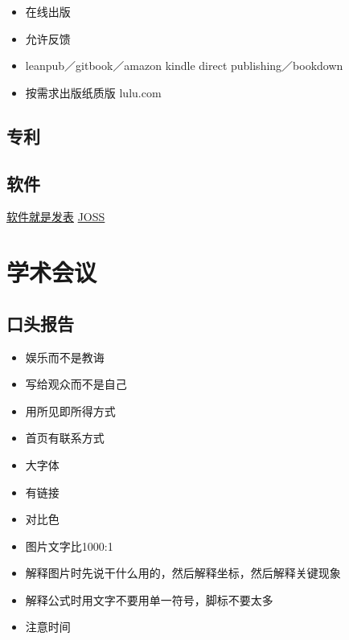\documentclass[]{tufte-book}
\providecommand{\tightlist}{%
  \setlength{\itemsep}{0pt}\setlength{\parskip}{0pt}}
\begin{document}
\begin{itemize}
\tightlist
\item
  在线出版
\item
  允许反馈
\item
  leanpub／gitbook／amazon kindle direct publishing／bookdown
\item
  按需求出版纸质版 lulu.com
\end{itemize}

\hypertarget{ux4e13ux5229}{%
\subsection{专利}\label{ux4e13ux5229}}

\hypertarget{ux8f6fux4ef6}{%
\subsection{软件}\label{ux8f6fux4ef6}}

\href{https://simplystatistics.org/2018/05/03/software-as-an-academic-publication/}{软件就是发表}
\href{http://joss.theoj.org/}{JOSS}

\hypertarget{ux5b66ux672fux4f1aux8bae}{%
\section{学术会议}\label{ux5b66ux672fux4f1aux8bae}}

\hypertarget{ux53e3ux5934ux62a5ux544a}{%
\subsection{口头报告}\label{ux53e3ux5934ux62a5ux544a}}

\begin{itemize}
\tightlist
\item
  娱乐而不是教诲
\item
  写给观众而不是自己
\item
  用所见即所得方式
\item
  首页有联系方式
\item
  大字体
\item
  有链接
\item
  对比色
\item
  图片文字比1000:1
\item
  解释图片时先说干什么用的，然后解释坐标，然后解释关键现象
\item
  解释公式时用文字不要用单一符号，脚标不要太多
\item
  注意时间
\end{itemize}
\end{document}
